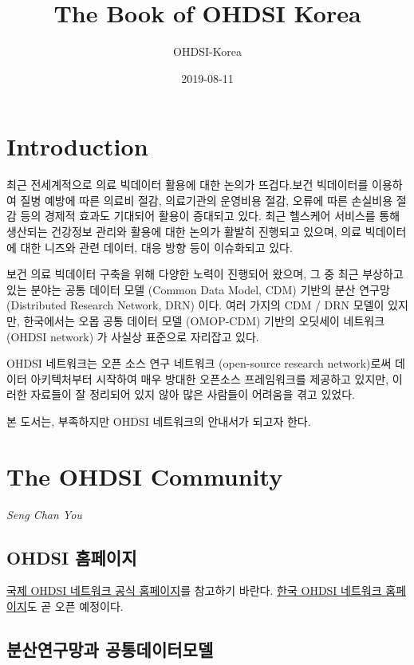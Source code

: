 \documentclass[]{book}
\title{The Book of OHDSI Korea}
\author{OHDSI-Korea}
\date{2019-08-11}
\begin{document}
\maketitle

{
\setcounter{tocdepth}{1}
\tableofcontents
}
\hypertarget{introduction}{%
\chapter{Introduction}\label{introduction}}

최근 전세계적으로 의료 빅데이터 활용에 대한 논의가 뜨겁다.보건 빅데이터를 이용하여 질병 예방에 따른 의료비 절감, 의료기관의 운영비용 절감, 오류에 따른 손실비용 절감 등의 경제적 효과도 기대되어 활용이 증대되고 있다. 최근 헬스케어 서비스를 통해 생산되는 건강정보 관리와 활용에 대한 논의가 활발히 진행되고 있으며, 의료 빅데이터에 대한 니즈와 관련 데이터, 대응 방향 등이 이슈화되고 있다.

보건 의료 빅데이터 구축을 위해 다양한 노력이 진행되어 왔으며, 그 중 최근 부상하고 있는 분야는 공통 데이터 모델 (Common Data Model, CDM) 기반의 분산 연구망 (Distributed Research Network, DRN) 이다. 여러 가지의 CDM / DRN 모델이 있지만, 한국에서는 오몹 공통 데이터 모델 (OMOP-CDM) 기반의 오딧세이 네트워크 (OHDSI network) 가 사실상 표준으로 자리잡고 있다.

OHDSI 네트워크는 오픈 소스 연구 네트워크 (open-source research network)로써 데이터 아키텍처부터 시작하여 매우 방대한 오픈소스 프레임워크를 제공하고 있지만, 이러한 자료들이 잘 정리되어 있지 않아 많은 사람들이 어려움을 겪고 있었다.

본 도서는, 부족하지만 OHDSI 네트워크의 안내서가 되고자 한다.

\hypertarget{ohdsiCommunity}{%
\chapter{The OHDSI Community}\label{ohdsiCommunity}}

\emph{Seng Chan You}

\hypertarget{ohdsi-}{%
\section{OHDSI 홈페이지}\label{ohdsi-}}

\href{https://www.ohdsi.org/}{국제 OHDSI 네트워크 공식 홈페이지}를 참고하기 바란다. \href{https://www.ohdsi-korea.org/}{한국 OHDSI 네트워크 홈페이지}도 곧 오픈 예정이다.

\hypertarget{drnCdm}{%
\section{분산연구망과 공통데이터모델}\label{drnCdm}}
\end{document}
